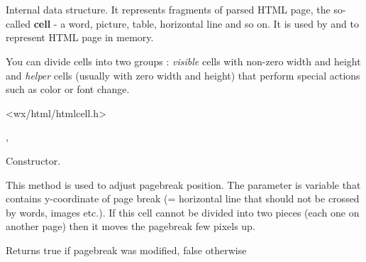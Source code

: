 
\section{}\label{wxhtmlcell}

Internal data structure. It represents fragments of parsed HTML
page, the so-called {\bf cell} - a word, picture, table, horizontal line and so on.
It is used by  and 
 to represent HTML page in memory.

You can divide cells into two groups : {\it visible} cells with non-zero width and
height and {\it helper} cells (usually with zero width and height) that
perform special actions such as color or font change.




<wx/html/htmlcell.h>


,


\label{wxhtmlcellwxhtmlcell}


Constructor.

\label{wxhtmlcelladjustpagebreak}


This method is used to adjust pagebreak position. The parameter is
variable that contains y-coordinate of page break (= horizontal line that
should not be crossed by words, images etc.). If this cell cannot be divided
into two pieces (each one on another page) then it moves the pagebreak
few pixels up.

Returns true if pagebreak was modified, false otherwise

